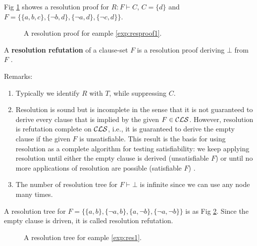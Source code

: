 \documentclass[12pt]{book}
\begin{document}
 \begin{examp}\label{exp:resproof1}
      Fig \ref{fig:proof1} showes a resolution proof for  $R: F \vdash C$, $C=\{d\}$ and $F = \{\{a,b,c\},\{\neg b,d\},\{\neg a, d\},\{\neg c, d\}\}$. 
	   \begin{figure}
	   \centering  
	   \caption{A resolution proof for eample  \ref{exp:resproof1}.}
	   \label{fig:proof1}
       \end{figure}
\end{examp}

\begin{defi}\label{def:resrefutation}
  A \textbf{resolution refutation} of a clause-set $F$ is a resolution proof deriving $\bot$ from $F$ \cite{h5}. 
\end{defi}
  
Remarks:
\begin{enumerate}
      \item Typically we identify $R$ with $T$, while suppressing $C$.
	  \item Resolution is sound but is incomplete in the sense that it is not guaranteed to derive every clause that is implied by the given $F \in \mathcal{CLS}$. 
	  However, resolution is refutation complete on $\mathcal{CLS}$, i.e., it is guaranteed to derive the empty clause if the given $F$ is unsatisfiable. 
	  This result is the basis for using resolution as a complete algorithm for testing satisfiability: we keep applying resolution until either 
	  the empty clause is derived (unsatisfiable $F$) or until no more applications of resolution are possible (satisfiable $F$) \cite{h6}.
	  \item The number of resolution tree for $F \vdash \bot$ is infinite since we can use any node many times.
\end{enumerate}

 \begin{examp}\label{exp:res1}
      A resolution tree for $F = \{\{a,b\},\{\neg a,b\},\{a, \neg b\},\{\neg a, \neg b\}\}$ is as Fig \ref{fig:resol1}. Since the empty clause 
	  is driven, it is called resolution refutation.
	   \begin{figure}
	   \centering  
	   \caption{A resolution tree for eample  \ref{exp:res1}.}
	   \label{fig:resol1}
       \end{figure}
\end{examp}
\end{document}
